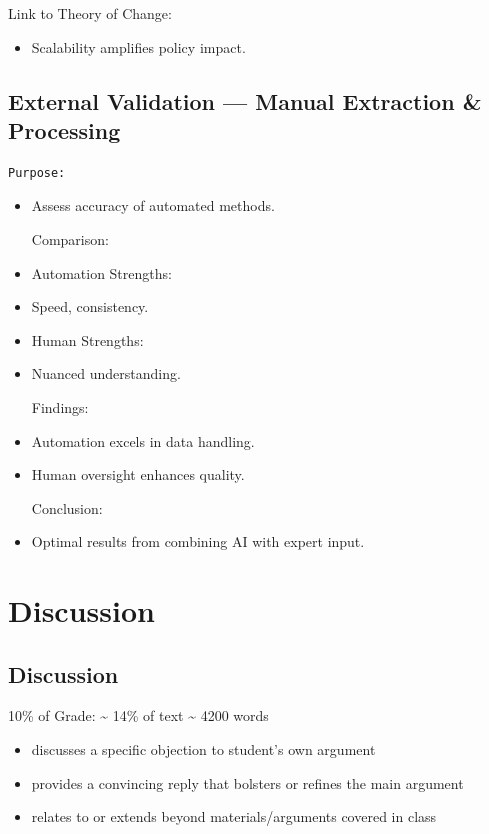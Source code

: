 \documentclass[
  letterpaper,
]{book}
\providecommand{\tightlist}{%
  \setlength{\itemsep}{0pt}\setlength{\parskip}{0pt}}
\begin{document}
Link to Theory of Change:

\begin{itemize}
\tightlist
\item
  Scalability amplifies policy impact.
\end{itemize}

\section{External Validation --- Manual Extraction \&
Processing}\label{external-validation-manual-extraction-processing}

\begin{verbatim}
Purpose:
\end{verbatim}

\begin{itemize}
\item
  Assess accuracy of automated methods.

  Comparison:
\item
  Automation Strengths:\\
\item
  Speed, consistency.\\
\item
  Human Strengths:\\
\item
  Nuanced understanding.

  Findings:
\item
  Automation excels in data handling.\\
\item
  Human oversight enhances quality.

  Conclusion:
\item
  Optimal results from combining AI with expert input.
\end{itemize}


\chapter{Discussion}\label{discussion}

\section{Discussion}\label{discussion-1}

10\% of Grade: \textasciitilde{} 14\% of text \textasciitilde{} 4200
words

\begin{itemize}
\tightlist
\item
  discusses a specific objection to student's own argument
\item
  provides a convincing reply that bolsters or refines the main argument
\item
  relates to or extends beyond materials/arguments covered in class
\end{itemize}
\end{document}
